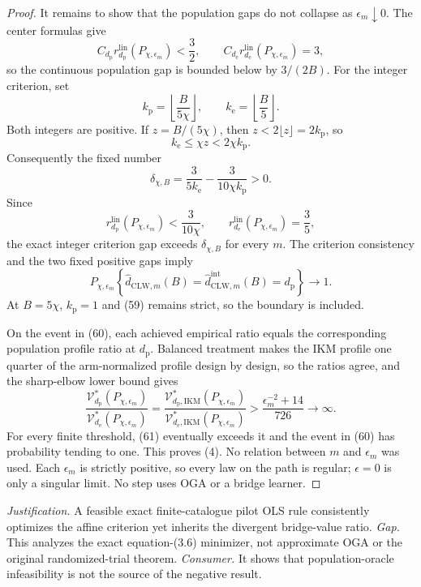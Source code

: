 \documentclass{article}
\begin{document}
\begin{proof}
It remains to show that the population gaps do not collapse as \(\epsilon_m\downarrow0\).  The center formulas give
\[
 C_{d_{\mathrm p}}r_{d_{\mathrm p}}^{\mathrm{lin}}(P_{\chi,\epsilon_m})<\frac32,
 \qquad
 C_{d_{\mathrm e}}r_{d_{\mathrm e}}^{\mathrm{lin}}(P_{\chi,\epsilon_m})=3, \tag{58}
\]
so the continuous population gap is bounded below by \(3/(2B)\).  For the integer criterion, set
\[
 k_{\mathrm p}=\left\lfloor\frac{B}{5\chi}\right\rfloor,
 \qquad
 k_{\mathrm e}=\left\lfloor\frac B5\right\rfloor.
\]
Both integers are positive.  If \(z=B/(5\chi)\), then \(z<2\lfloor z\rfloor=2k_{\mathrm p}\), so
\[
 k_{\mathrm e}\le\chi z<2\chi k_{\mathrm p}.
\]
Consequently the fixed number
\[
 \delta_{\chi,B}
 =\frac{3}{5k_{\mathrm e}}-
 \frac{3}{10\chi k_{\mathrm p}}>0.                        \tag{59}
\]
Since
\[
 r_{d_{\mathrm p}}^{\mathrm{lin}}(P_{\chi,\epsilon_m})
 <\frac3{10\chi},
 \qquad
 r_{d_{\mathrm e}}^{\mathrm{lin}}(P_{\chi,\epsilon_m})=\frac35,
\]
the exact integer criterion gap exceeds \(\delta_{\chi,B}\) for every \(m\).  The criterion consistency and the two fixed positive gaps imply
\[
 P_{\chi,\epsilon_m}\!\left\{
 \widehat d_{\mathrm{CLW},m}(B)
 =\widehat d_{\mathrm{CLW},m}^{\mathrm{int}}(B)
 =d_{\mathrm p}\right\}\longrightarrow1.                \tag{60}
\]
At \(B=5\chi\), \(k_{\mathrm p}=1\) and (59) remains strict, so the boundary is included.

On the event in (60), each achieved empirical ratio equals the corresponding population profile ratio at \(d_{\mathrm p}\).  Balanced treatment makes the IKM profile one quarter of the arm-normalized profile design by design, so the ratios agree, and the sharp-elbow lower bound gives
\[
 \frac{\mathcal V_{d_{\mathrm p}}^*(P_{\chi,\epsilon_m})}
 {\mathcal V_{d_{\mathrm e}}^*(P_{\chi,\epsilon_m})}
 =\frac{\mathcal V_{d_{\mathrm p},\mathrm{IKM}}^*(P_{\chi,\epsilon_m})}
 {\mathcal V_{d_{\mathrm e},\mathrm{IKM}}^*(P_{\chi,\epsilon_m})}
 >\frac{\epsilon_m^{-2}+14}{726}\longrightarrow\infty.  \tag{61}
\]
For every finite threshold, (61) eventually exceeds it and the event in (60) has probability tending to one.  This proves (4).  No relation between \(m\) and \(\epsilon_m\) was used.  Each \(\epsilon_m\) is strictly positive, so every law on the path is regular; \(\epsilon=0\) is only a singular limit.  No step uses OGA or a bridge learner.
\end{proof}
\par\smallskip\noindent \textit{Justification.} A feasible exact finite-catalogue pilot OLS rule consistently optimizes the affine criterion yet inherits the divergent bridge-value ratio. \textit{Gap.} This analyzes the exact equation-(3.6) minimizer, not approximate OGA or the original randomized-trial theorem. \textit{Consumer.} It shows that population-oracle infeasibility is not the source of the negative result.
\end{document}
